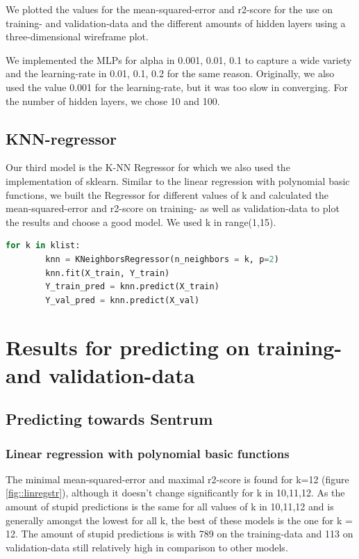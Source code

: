 \documentclass[12pt,a4paper]{scrartcl}		%
\begin{document}
We plotted the values for the mean-squared-error and r2-score for the use on training- and validation-data and the different 
amounts of hidden layers using a three-dimensional wireframe plot. 

We implemented the MLPs for alpha in {0.001, 0.01, 0.1} to capture a wide variety and the learning-rate in {0.01, 0.1, 0.2} 
for the same reason. Originally, we also used the value 0.001 for the learning-rate, but it was too slow in converging. 
For the number of hidden layers, we chose 10 and 100. 

\subsection{KNN-regressor}
Our third model is the K-NN Regressor for which we also used the implementation of sklearn. Similar to the linear regression 
with polynomial basic functions, we built the Regressor for different values of k and calculated the mean-squared-error and 
r2-score on training- as well as validation-data to plot the results and choose a good model. We used k in range(1,15). 

\begin{lstlisting}[language=Python]
    for k in klist:
        knn = KNeighborsRegressor(n_neighbors = k, p=2)
        knn.fit(X_train, Y_train)
        Y_train_pred = knn.predict(X_train)
        Y_val_pred = knn.predict(X_val)
\end{lstlisting}

\section{Results for predicting on training- and validation-data}
\subsection{Predicting towards Sentrum}

\subsubsection{Linear regression with polynomial basic functions}
The minimal mean-squared-error and maximal r2-score is found for k=12 (figure \ref{fig::linregstr}), although it doesn’t change significantly for k in {10,11,12}. 
As the amount of stupid predictions is the same for all values of k in {10,11,12} and is generally amongst the lowest for all k, 
the best of these models is the one for k = 12. The amount of stupid predictions is with 789 on the training-data and 113 on 
validation-data still relatively high in comparison to other models.
\end{document}
